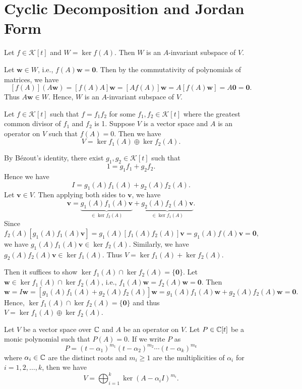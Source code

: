 \section{Cyclic Decomposition and Jordan Form}
\begin{propositionenv}\label{prop: kernel is invariant}
    Let $f\in \mathcal K[t]$ and $W = \ker f(A)$. Then $W$ is an $A$-invariant subspace of $V$.
\end{propositionenv}
\begin{proofenv}
    Let $\bm w \in W$, i.e., $f(A) \bm w = \bm 0$. Then by the commutativity of polynomials of matrices, we have
    $$ [f(A)](A\bm w) = [f(A) A] \bm w = [A f(A)] \bm w = A [f(A) \bm w] = A \bm 0 = \bm 0. $$
    Thus $A\bm w \in W$. Hence, $W$ is an $A$-invariant subspace of $V$.
\end{proofenv}
\begin{theoremenv}\label{thm: kernel decomposition}
    Let $f\in \mathcal K[t]$ such that $f = f_1 f_2$ for some $f_1, f_2 \in \mathcal K[t]$ where the greatest common divisor of $f_1$ and $f_2$ is 1. Suppose $V$ is a vector space and $A$ is an operator on $V$ such that $f(A) = 0$. Then we have
    $$ V = \ker f_1(A) \oplus \ker f_2(A). $$
\end{theoremenv}
\begin{proofenv}
    By Bézout's identity, there exist $g_1, g_2 \in \mathcal K[t]$ such that
    $$ 1 = g_1 f_1 + g_2 f_2. $$
    Hence we have
    $$ I = g_1(A) f_1(A) + g_2(A) f_2(A). $$
    Let $\bm v \in V$. Then applying both sides to $\bm v$, we have
    $$ \bm v = \underbrace{g_1(A) f_1(A) \bm v}_{\in \ker f_2(A)} + \underbrace{g_2(A) f_2(A) \bm v}_{\in \ker f_1(A)}. $$
    Since
    $$ f_2(A) [g_1(A) f_1(A) \bm v] = g_1(A) [f_1(A) f_2(A)] \bm v =g_1(A) f(A) \bm v= \bm 0, $$
    we have $g_1(A) f_1(A) \bm v \in \ker f_2(A)$. Similarly, we have $g_2(A) f_2(A) \bm v \in \ker f_1(A)$. Thus $V = \ker f_1(A) + \ker f_2(A)$.

    Then it suffices to show $\ker f_1(A) \cap \ker f_2(A) = \{ \bm 0 \}$. Let $\bm w \in \ker f_1(A) \cap \ker f_2(A)$, i.e., $f_1(A) \bm w = f_2(A) \bm w = \bm 0$. Then
    $$ \bm w = I \bm w = [g_1(A) f_1(A) + g_2(A) f_2(A)] \bm w = g_1(A) f_1(A) \bm w + g_2(A) f_2(A) \bm w = \bm 0. $$
    Hence, $\ker f_1(A) \cap \ker f_2(A) = \{ \bm 0 \}$ and thus $V = \ker f_1(A) \oplus \ker f_2(A)$.
\end{proofenv}
\begin{theoremenv}
    Let $V$ be a vector space over $\mathbb{C}$ and $A$ be an operator on $V$. Let $P\in \mathbb{C}[t]$ be a monic polynomial such that $P(A) = 0$. If we write $P$ as
    $$ P = (t - \alpha_1)^{m_1} (t - \alpha_2)^{m_2} \cdots (t - \alpha_k)^{m_k} $$
    where $\alpha_i \in \mathbb{C}$ are the distinct roots and $m_i \ge 1$ are the multiplicities of $\alpha_i$ for $i=1,2,\ldots,k$, then we have
    $$ V = \bigoplus_{i=1}^k \ker (A - \alpha_i I)^{m_i}. $$
\end{theoremenv}

